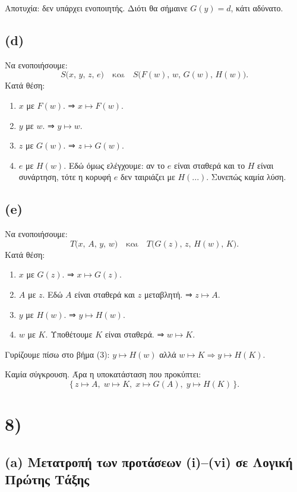 \documentclass[a4paper,12pt]{article}
\begin{document}
Αποτυχία: δεν υπάρχει ενοποιητής. Διότι θα σήμαινε $G(y) = d$, κάτι αδύνατο.

\subsection*{(d)}
Να ενοποιήσουμε:
\[
S\bigl(x,\,y,\,z,\,e\bigr)\quad\text{και}\quad S\bigl(F(w),\,w,\,G(w),\,H(w)\bigr).
\]
Κατά θέση:
\begin{enumerate}
    \item $x$ με $F(w)$. ⇒ $x \mapsto F(w)$.
    \item $y$ με $w$. ⇒ $y \mapsto w$.
    \item $z$ με $G(w)$. ⇒ $z \mapsto G(w)$.
    \item $e$ με $H(w)$. Εδώ όμως ελέγχουμε: αν το $e$ είναι σταθερά και το $H$ είναι συνάρτηση, τότε η κορυφή $e$ δεν ταιριάζει με $H(...)$. Συνεπώς καμία λύση.
\end{enumerate}

\subsection*{(e)}
Να ενοποιήσουμε:
\[
T\bigl(x,\,A,\,y,\,w\bigr)\quad\text{και}\quad T\bigl(G(z),\,z,\,H(w),\,K\bigr).
\]
Κατά θέση:
\begin{enumerate}
    \item $x$ με $G(z)$. ⇒ $x \mapsto G(z)$.
    \item $A$ με $z$. Εδώ $A$ είναι σταθερά και $z$ μεταβλητή. ⇒ $z \mapsto A$.
    \item $y$ με $H(w)$. ⇒ $y \mapsto H(w)$.
    \item $w$ με $K$. Υποθέτουμε $K$ είναι σταθερά. ⇒ $w \mapsto K$.
\end{enumerate}

Γυρίζουμε πίσω στο βήμα (3): $y \mapsto H(w)$ αλλά $w \mapsto K \Rightarrow y \mapsto H(K)$.

Καμία σύγκρουση. Άρα η υποκατάσταση που προκύπτει:
\[
\{\,z \mapsto A,\; w \mapsto K,\; x \mapsto G(A),\; y \mapsto H(K)\,\}.
\]


\section*{8)}

\subsection*{(a) Μετατροπή των προτάσεων (i)–(vi) σε Λογική Πρώτης Τάξης}
\end{document}
